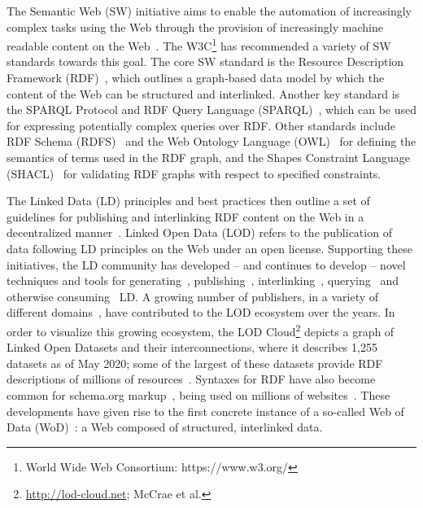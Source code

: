 \documentclass[sw]{iosart2x}
\begin{document}

The Semantic Web (SW) initiative aims to enable the automation of increasingly complex tasks using the Web through the provision of increasingly machine readable content on the Web~\cite{semwebsa}. The W3C\footnote{World Wide Web Consortium: https://www.w3.org/ } has recommended a variety of SW standards towards this goal. The core SW standard is the Resource Description Framework (RDF)~\cite{rdfconcepts11}, which outlines a graph-based data model by which the content of the Web can be structured and interlinked. Another key standard is the SPARQL Protocol and RDF Query Language (SPARQL)~\cite{sparql11}, which can be used for expressing potentially complex queries over RDF. Other standards include RDF Schema (RDFS)~\cite{rdfschema11} and the Web Ontology Language (OWL)~\cite{owl2primer} for defining the semantics of terms used in the RDF graph, and the Shapes Constraint Language (SHACL)~\cite{shacl} for validating RDF graphs with respect to specified constraints.

The Linked Data (LD) principles and best practices then outline a set of guidelines for publishing and interlinking RDF content on the Web in a decentralized manner~\cite{ldbook}. Linked Open Data (LOD) refers to the publication of data following LD principles on the Web under an open license. Supporting these initiatives, the LD community has developed -- and continues to develop -- novel techniques and tools for generating~\cite{Bizer03,GentileZC15}, publishing~\cite{CorlosquetDCPD09,MaaliCP12}, interlinking~\cite{silk,NgomoA11}, querying~\cite{HartigBF09,VerborghSHHVMHC16} and otherwise consuming~\cite{TummarelloDO07,swsejws} LD. A growing number of publishers, in a variety of different domains~\cite{SchmachtenbergBP14}, have contributed to the LOD ecosystem over the years. In order to visualize this growing ecosystem, the LOD Cloud\footnote{\url{http://lod-cloud.net}; McCrae et al.} depicts a graph of Linked Open Datasets and their interconnections, where it describes 1,255 datasets as of May 2020; some of the largest of these datasets provide RDF descriptions of millions of resources~\cite{ErxlebenGKMV14,dbpedia}. Syntaxes for RDF have also become common for schema.org markup~\cite{schemaorg}, being used on millions of websites~\cite{MeuselPB14}.
These developments have given rise to the first concrete instance of a so-called Web of Data (WoD)~\cite{wodbook}: a Web composed of structured, interlinked data.
\end{document}
